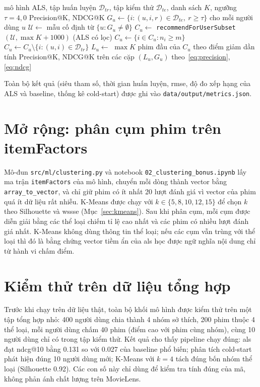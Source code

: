 \begin{algorithm}[H]
\caption{Đánh giá xếp hạng Top-K}
\label{alg:ranking}
\begin{algorithmic}[1]
\Require mô hình ALS, tập huấn luyện $\mathcal{D}_{tr}$, tập kiểm thử $\mathcal{D}_{te}$, danh sách $K$, ngưỡng $\tau = 4{,}0$
\Ensure Precision@K, NDCG@K
\State $G_u \gets \{ i : (u,i,r) \in \mathcal{D}_{te},\ r \ge \tau \}$ cho mỗi người dùng $u$
\State $\mathcal{U} \gets$ mẫu cố định từ $\{ u : G_u \neq \emptyset \}$
\State $C_u \gets$ \texttt{recommendForUserSubset}$(\mathcal{U}, \max K + 1000)$
\State (ALS có lọc) $C_u \gets \{ i \in C_u : n_i \ge m \}$ 
\State $C_u \gets C_u \setminus \{ i : (u,i) \in \mathcal{D}_{tr} \}$ 
\State $L_u \gets$ $\max K$ phim đầu của $C_u$ theo điểm giảm dần
  \State tính Precision@K, NDCG@K trên các cặp $(L_u, G_u)$ theo~\eqref{eq:precision}, \eqref{eq:ndcg}
\EndFor
\end{algorithmic}
\end{algorithm}

Toàn bộ kết quả (siêu tham số, thời gian huấn luyện, \gls{rmse}, độ đo xếp hạng của ALS và baseline, thống kê cold-start) được ghi vào \texttt{data/output/metrics.json}.

\section{Mở rộng: phân cụm phim trên itemFactors}
\label{sec:clustering}
Mô-đun \texttt{src/ml/clustering.py} và notebook \texttt{02\_clustering\_bonus.ipynb} lấy ma trận \texttt{itemFactors} của mô hình, chuyển mỗi dòng thành vector bằng \texttt{array\_to\_vector}, và chỉ giữ phim có ít nhất \num{20} lượt đánh giá vì vector của phim quá ít dữ liệu rất nhiễu. K-Means được chạy với $k \in \{5, 8, 10, 12, 15\}$ để chọn $k$ theo Silhouette và \gls{wssse} (Mục~\ref{sec:kmeans}). Sau khi phân cụm, mỗi cụm được diễn giải bằng các thể loại chiếm tỉ lệ cao nhất và các phim có nhiều lượt đánh giá nhất. K-Means không dùng thông tin thể loại; nếu các cụm vẫn trùng với thể loại thì đó là bằng chứng vector tiềm ẩn của \gls{als} học được ngữ nghĩa nội dung chỉ từ hành vi chấm điểm.

\section{Kiểm thử trên dữ liệu tổng hợp}
\label{sec:smoke}
Trước khi chạy trên dữ liệu thật, toàn bộ khối mô hình được kiểm thử trên một tập tổng hợp nhỏ: \num{400} người dùng chia thành \num{4} nhóm sở thích, \num{200} phim thuộc \num{4} thể loại, mỗi người dùng chấm \num{40} phim (điểm cao với phim cùng nhóm), cùng \num{10} người dùng chỉ có trong tập kiểm thử. Kết quả cho thấy pipeline chạy đúng: \gls{als} đạt \gls{ndcg}@10 bằng \num{0,131} so với \num{0,027} của baseline phổ biến; phân tích cold-start phát hiện đúng \num{10} người dùng mới; K-Means với $k=4$ tách đúng bốn nhóm thể loại (Silhouette \num{0,92}). Các con số này chỉ dùng để kiểm tra tính đúng của mã, không phản ánh chất lượng trên MovieLens.
